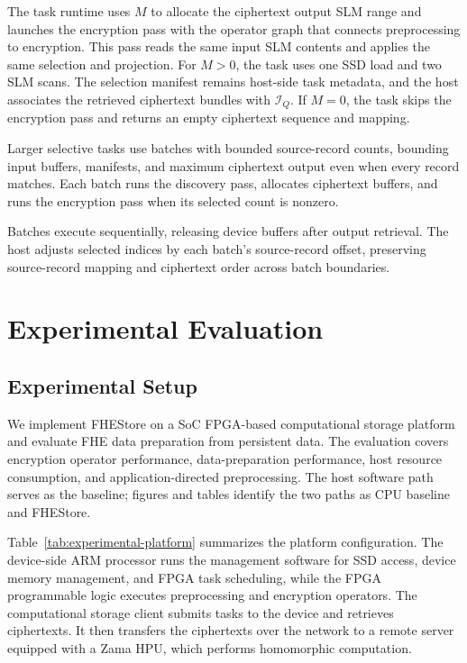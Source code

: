 \documentclass[sigconf,anonymous,balance=false]{acmart}
\newcommand{\bodypar}{\par\vskip 0pt plus 6pt\relax}
\begin{document}
The task runtime uses $M$ to allocate the ciphertext output SLM range and launches the encryption pass with the operator graph that connects preprocessing to encryption. This pass reads the same input SLM contents and applies the same selection and projection. For $M>0$, the task uses one SSD load and two SLM scans. The selection manifest remains host-side task metadata, and the host associates the retrieved ciphertext bundles with $\mathcal{I}_Q$. If $M=0$, the task skips the encryption pass and returns an empty ciphertext sequence and mapping.
\bodypar

Larger selective tasks use batches with bounded source-record counts, bounding input buffers, manifests, and maximum ciphertext output even when every record matches. Each batch runs the discovery pass, allocates ciphertext buffers, and runs the encryption pass when its selected count is nonzero.
\bodypar

Batches execute sequentially, releasing device buffers after output retrieval. The host adjusts selected indices by each batch's source-record offset, preserving source-record mapping and ciphertext order across batch boundaries.

\section{Experimental Evaluation}
\label{sec:evaluation}
\subsection{Experimental Setup}
We implement FHEStore on a SoC FPGA-based computational storage platform and evaluate FHE data preparation from persistent data. The evaluation covers encryption operator performance, data-preparation performance, host resource consumption, and application-directed preprocessing. The host software path serves as the baseline; figures and tables identify the two paths as CPU baseline and FHEStore.
\bodypar

Table~\ref{tab:experimental-platform} summarizes the platform configuration. The device-side ARM processor runs the management software for SSD access, device memory management, and FPGA task scheduling, while the FPGA programmable logic executes preprocessing and encryption operators. The computational storage client submits tasks to the device and retrieves ciphertexts. It then transfers the ciphertexts over the network to a remote server equipped with a Zama HPU, which performs homomorphic computation.
\bodypar
\end{document}
